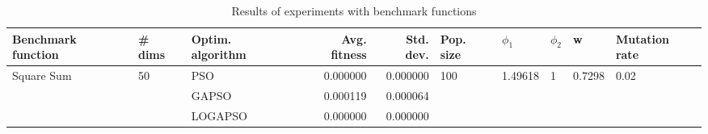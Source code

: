 \begin{table}
\centering
\caption{Results of experiments with benchmark functions}
\begin{tabular}{lllrrlllll}
\toprule
         Benchmark function &             \# dims & Optim. algorithm &  Avg. fitness &  Std. dev. &            Pop. size &               $\phi_{1}$ &         $\phi_{2}$ &                       w &         Mutation rate \\
\midrule
\multirow{3}{*}{Square Sum} & \multirow{3}{*}{50} &              PSO &      0.000000 &   0.000000 & \multirow{3}{*}{100} & \multirow{3}{*}{1.49618} & \multirow{3}{*}{1} & \multirow{3}{*}{0.7298} & \multirow{3}{*}{0.02} \\
                            &                     &            GAPSO &      0.000119 &   0.000064 &                      &                          &                    &                         &                       \\
                            &                     &          LOGAPSO &      0.000000 &   0.000000 &                      &                          &                    &                         &                       \\
\bottomrule
\end{tabular}
\end{table}
